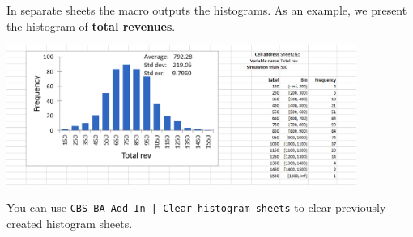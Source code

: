 \documentclass[12pt]{article}
\begin{document}
In separate sheets the macro outputs the histograms. As an example, we present the histogram of \textbf{total revenues}.

\medskip

\centerline{\includegraphics[width=4.5in]{figures/simul8.png}}

You can use \texttt{CBS BA Add-In | Clear histogram sheets} to clear previously created histogram sheets.
\end{document}

